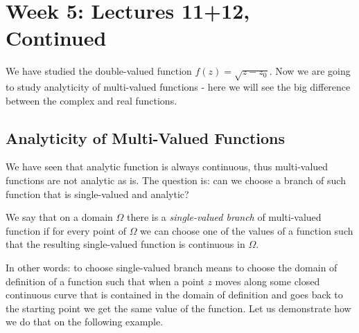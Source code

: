 \documentclass[12pt]{article}
\begin{document}
\section{Week 5: Lectures 11+12, Continued}

We have studied the double-valued function $f(z) = \sqrt{z-z_0}$.
Now we are going to study analyticity of multi-valued functions - here we will see the big difference between the complex and real functions.

\subsection{Analyticity of Multi-Valued Functions}

We have seen that analytic function is always continuous, thus multi-valued functions are not analytic as is. The question is: can we choose a branch of such function that is single-valued and analytic?

\begin{definition}
We say that on a domain $\Omega$ there is a \emph{single-valued branch} of multi-valued function if for every point of $\Omega$ we can choose one of the values of a function such that the resulting single-valued function is continuous in $\Omega$.
\end{definition}

In other words: to choose single-valued branch means to choose the domain of definition of a function such that when a point $z$ moves along some closed continuous curve that is contained in the domain of definition and goes back to the starting point we get the same value of the function.
Let us demonstrate how we do that on the following example.
\end{document}
